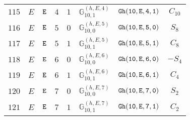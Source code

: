 \documentclass[fleqn,8pt]{jsarticle}
\begin{document}
\begin{table}[ht!]
\begin{center}
\begin{tabular}{cccccccc}
$ 115 $ & $ E $ & $ {\tt E} $ & $ 4 $ & $ 1 $ & $ \mathbb{G}_{10,1}^{(h,E,4)} $ & $ {\tt Gh(10,E,4,1)} $ & $ C_{10} $ \\
$ 116 $ & $ E $ & $ {\tt E} $ & $ 5 $ & $ 0 $ & $ \mathbb{G}_{10,0}^{(h,E,5)} $ & $ {\tt Gh(10,E,5,0)} $ & $ S_{8} $ \\
$ 117 $ & $ E $ & $ {\tt E} $ & $ 5 $ & $ 1 $ & $ \mathbb{G}_{10,1}^{(h,E,5)} $ & $ {\tt Gh(10,E,5,1)} $ & $ C_{8} $ \\
$ 118 $ & $ E $ & $ {\tt E} $ & $ 6 $ & $ 0 $ & $ \mathbb{G}_{10,0}^{(h,E,6)} $ & $ {\tt Gh(10,E,6,0)} $ & $ - S_{4} $ \\
$ 119 $ & $ E $ & $ {\tt E} $ & $ 6 $ & $ 1 $ & $ \mathbb{G}_{10,1}^{(h,E,6)} $ & $ {\tt Gh(10,E,6,1)} $ & $ C_{4} $ \\
$ 120 $ & $ E $ & $ {\tt E} $ & $ 7 $ & $ 0 $ & $ \mathbb{G}_{10,0}^{(h,E,7)} $ & $ {\tt Gh(10,E,7,0)} $ & $ S_{2} $ \\
$ 121 $ & $ E $ & $ {\tt E} $ & $ 7 $ & $ 1 $ & $ \mathbb{G}_{10,1}^{(h,E,7)} $ & $ {\tt Gh(10,E,7,1)} $ & $ C_{2} $ \\
 \hline \hline
\end{tabular}
\end{center}
\end{table}
\end{document}
